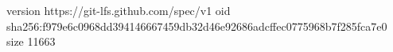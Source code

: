 version https://git-lfs.github.com/spec/v1
oid sha256:f979e6c0968dd394146667459db32d46e92686adcffec0775968b7f285fca7e0
size 11663
